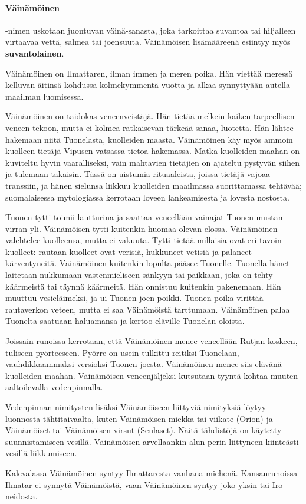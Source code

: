   \paragraph{Väinämöinen}-nimen uskotaan juontuvan väinä-sanasta, joka tarkoittaa suvantoa tai
    hiljalleen virtaavaa vettä, salmea tai joensuuta. Väinämöisen lisämääreenä esiintyy myös
    \textbf{suvantolainen}.
    \par
    Väinämöinen on Ilmattaren, ilman immen ja meren poika. Hän viettää meressä kelluvan äitinsä
    kohdussa kolmekymmentä vuotta ja alkaa synnyttyään autella maailman luomisessa.
    \par
    Väinämöinen on taidokas veneenveistäjä. Hän tietää melkein kaiken tarpeellisen veneen tekoon,
    mutta ei kolmea ratkaisevan tärkeää sanaa, luotetta. Hän lähtee hakemaan niitä Tuonelasta,
    kuolleiden maasta. Väinämöinen käy myös ammoin kuolleen tietäjä Vipusen vatsassa tietoa
    hakemassa. Matka kuolleiden maahan on kuviteltu hyvin vaaralliseksi, vain mahtavien
    tietäjien on ajateltu pystyvän siihen ja tulemaan takaisin. Tässä on uistumia rituaaleista,
    joissa tietäjä vajoaa transsiin, ja hänen sielunsa liikkuu kuolleiden maailmassa suorittamassa
    tehtävää; suomalaisessa mytologiassa kerrotaan loveen lankeamisesta ja lovesta nostosta.
    \par
    Tuonen tytti toimii lautturina ja saattaa veneellään vainajat Tuonen mustan virran yli.
    Väinämöisen tytti kuitenkin huomaa olevan elossa. Väinämöinen valehtelee kuolleensa, mutta ei
    vakuuta. Tytti tietää millaisia ovat eri tavoin kuolleet: rautaan kuolleet ovat verisiä,
    hukkuneet vetisiä ja palaneet kärventyneitä. Väinämöinen kuitenkin lopulta pääsee Tuonelle.
    Tuonella hänet laitetaan nukkumaan vastenmieliseen sänkyyn tai paikkaan, joka on tehty
    käärmeistä tai täynnä käärmeitä. Hän onnistuu kuitenkin pakenemaan. Hän muuttuu vesieläimeksi,
    ja ui Tuonen joen poikki. Tuonen poika virittää rautaverkon veteen, mutta ei saa Väinämöistä
    tarttumaan. Väinämöinen palaa Tuonelta saatuaan haluamansa ja kertoo eläville Tuonelan
    oloista.
    \par
    Joissain runoissa kerrotaan, että Väinämöinen menee veneellään Rutjan koskeen, tuliseen
    pyörteeseen. Pyörre on usein tulkittu reitiksi Tuonelaan, vauhdikkaammaksi versioksi Tuonen
    joesta. Väinämöinen menee siis elävänä kuolleiden maahan. Väinämöisen veneenjäljeksi kutsutaan
    tyyntä kohtaa muuten aaltoilevalla vedenpinnalla.
    \par
    Vedenpinnan nimitysten lisäksi Väinämöiseen liittyviä nimityksiä löytyy luonnosta
    tähtitaivaalta, kuten Väinämöisen miekka tai viikate (Orion) ja Väinämöiset tai Väinämöisen
    virsut (Seulaset). Näitä tähdistöjä on käytetty suunnistamiseen vesillä. Väinämöisen
    arvellaankin alun perin liittyneen kiinteästi vesillä liikkumiseen.
    \par
    Kalevalassa Väinämöinen syntyy Ilmattaresta vanhana miehenä. Kansanrunoissa Ilmatar ei synnytä
    Väinämöistä, vaan Väinämöinen syntyy joko yksin tai Iro-neidosta.



